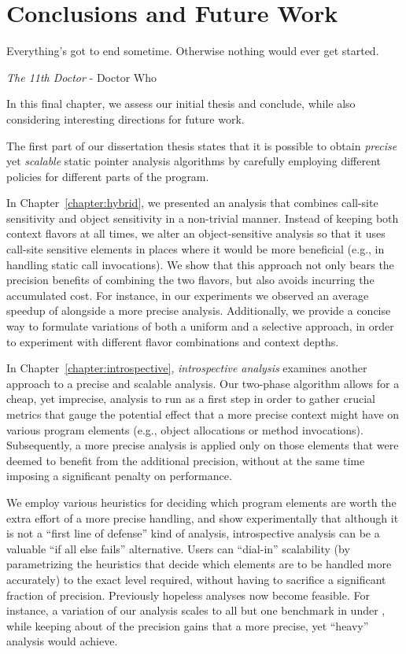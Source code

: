 \chapter{Conclusions and Future Work}
\label{chapter:conclusions}
\epigraph{Everything’s got to end sometime. Otherwise nothing would ever get started.}{\textit{The 11th Doctor} - Doctor Who}

In this final chapter, we assess our initial thesis and conclude, while also considering interesting directions for future work.

The first part of our dissertation thesis states that it is possible to obtain \emph{precise} yet \emph{scalable} static pointer analysis algorithms by carefully employing different policies for different parts of the program.

In Chapter~\ref{chapter:hybrid}, we presented an analysis that combines call-site sensitivity and object sensitivity in a non-trivial manner. Instead of keeping both context flavors at all times, we alter an object-sensitive analysis so that it uses call-site sensitive elements in places where it would be more beneficial (e.g., in handling static call invocations). We show that this approach not only bears the precision benefits of combining the two flavors, but also avoids incurring the accumulated cost. For instance, in our experiments we observed an average speedup of  alongside a more precise analysis. Additionally, we provide a concise way to formulate variations of both a uniform and a selective approach, in order to experiment with different flavor combinations and context depths.

In Chapter~\ref{chapter:introspective}, \emph{introspective analysis} examines another approach to a precise and scalable analysis. Our two-phase algorithm allows for a cheap, yet imprecise, analysis to run as a first step in order to gather crucial metrics that gauge the potential effect that a more precise context might have on various program elements (e.g., object allocations or method invocations). Subsequently, a more precise analysis is applied only on those elements that were deemed to benefit from the additional precision, without at the same time imposing a significant penalty on performance.

We employ various heuristics for deciding which program elements are worth the extra effort of a more precise handling, and show experimentally that although it is not a ``first line of defense'' kind of analysis, introspective analysis can be a valuable ``if all else fails'' alternative. Users can ``dial-in'' scalability (by parametrizing the heuristics that decide which elements are to be handled more accurately) to the exact level required, without having to sacrifice a significant fraction of precision. Previously hopeless analyses now become feasible. For instance, a variation of our analysis scales to all but one benchmark in under , while keeping about  of the precision gains that a more precise, yet ``heavy'' analysis would achieve.

